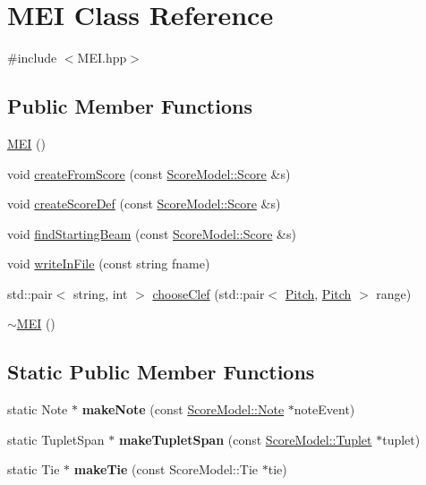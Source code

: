 \hypertarget{classMEI}{}\section{M\+EI Class Reference}
\label{classMEI}


{\ttfamily \#include $<$M\+E\+I.\+hpp$>$}

\subsection*{Public Member Functions}
\begin{DoxyCompactItemize}
\item 
\mbox{\hyperlink{group__output_ga67acb233e47d9942cb678fb24b67f799}{M\+EI}} ()
\item 
void \mbox{\hyperlink{group__output_ga28b9390a3699a9ae7abdba51cb3cb7d5}{create\+From\+Score}} (const \mbox{\hyperlink{classScoreModel_1_1Score}{Score\+Model\+::\+Score}} \&s)
\item 
void \mbox{\hyperlink{group__output_gaec3627352aed16ef31dfabe7d243c476}{create\+Score\+Def}} (const \mbox{\hyperlink{classScoreModel_1_1Score}{Score\+Model\+::\+Score}} \&s)
\item 
void \mbox{\hyperlink{classMEI_a5211ad9f61cfb653788c2c72df6e644c}{find\+Starting\+Beam}} (const \mbox{\hyperlink{classScoreModel_1_1Score}{Score\+Model\+::\+Score}} \&s)
\item 
void \mbox{\hyperlink{group__output_ga7f0c47ab091313feb0a7fba4d23e09da}{write\+In\+File}} (const string fname)
\item 
std\+::pair$<$ string, int $>$ \mbox{\hyperlink{group__output_ga707656b4b214953f8be23c95415a8ed5}{choose\+Clef}} (std\+::pair$<$ \mbox{\hyperlink{classPitch}{Pitch}}, \mbox{\hyperlink{classPitch}{Pitch}} $>$ range)
\item 
\mbox{\hyperlink{group__output_ga1e4233e0a65d642f227dba08be1fe592}{$\sim$\+M\+EI}} ()
\end{DoxyCompactItemize}
\subsection*{Static Public Member Functions}
\begin{DoxyCompactItemize}
\item 
static Note $\ast$ {\bfseries make\+Note} (const \mbox{\hyperlink{classScoreModel_1_1Note}{Score\+Model\+::\+Note}} $\ast$note\+Event)
\item 
static Tuplet\+Span $\ast$ {\bfseries make\+Tuplet\+Span} (const \mbox{\hyperlink{classScoreModel_1_1Tuplet}{Score\+Model\+::\+Tuplet}} $\ast$tuplet)
\item 
static Tie $\ast$ {\bfseries make\+Tie} (const Score\+Model\+::\+Tie $\ast$tie)
\end{DoxyCompactItemize}


